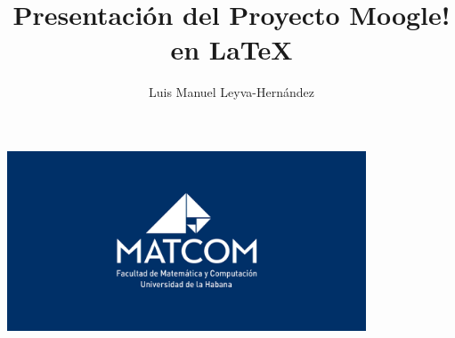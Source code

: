 \documentclass{slides}
\title{Presentación del Proyecto Moogle! en \LaTeX}
\author{Luis Manuel Leyva-Hernández}
\begin{document}
    \includegraphics[width=0.8\textwidth]{87f4e980-62a6-11eb-846f-4c58547cffc0.png}
    \maketitle

    
\end{document}
